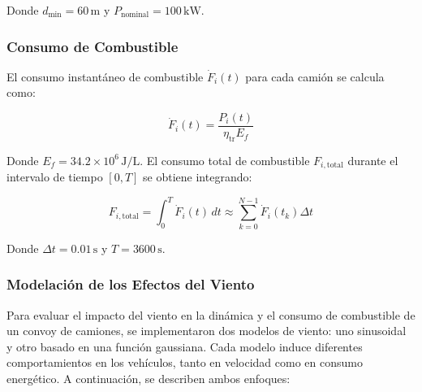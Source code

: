 \documentclass[11pt,stdletter,orderfromtodate,sigleft,twoside]{report}
\begin{document}
Donde $d_{\text{min}} = 60 \, \text{m}$ y $P_{\text{nominal}} = 100 \, \text{kW}$.

\subsubsection{Consumo de Combustible}

El consumo instantáneo de combustible $\dot{F}_i(t)$ para cada camión se calcula como:

\begin{equation}
\dot{F}_i(t) = \frac{P_i(t)}{\eta_{\text{tr}} E_f}
\end{equation}

Donde $E_f = 34.2 \times 10^6 \, \text{J/L}$. El consumo total de combustible $F_{i,\text{total}}$ durante el intervalo de tiempo $[0, T]$ se obtiene integrando:

\begin{equation}
F_{i,\text{total}} = \int_0^T \dot{F}_i(t) \, dt \approx \sum_{k=0}^{N-1} \dot{F}_i(t_k) \Delta t
\end{equation}

Donde $\Delta t = 0.01 \, \text{s}$ y $T = 3600 \, \text{s}$.




\subsubsection{Modelación de los Efectos del Viento }

Para evaluar el impacto del viento en la dinámica y el consumo de combustible de un convoy de camiones, se implementaron dos modelos de viento: uno sinusoidal y otro basado en una función gaussiana. Cada modelo induce diferentes comportamientos en los vehículos, tanto en velocidad como en consumo energético. A continuación, se describen ambos enfoques:
\end{document}

